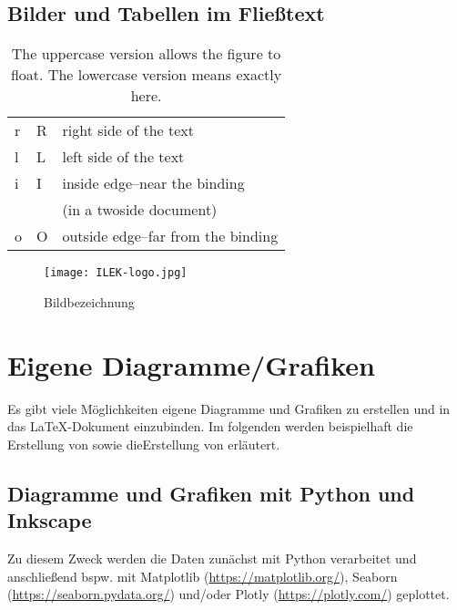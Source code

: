 \newpage

\subsection{Bilder und Tabellen im Fließtext}

\begin{wraptable}[]{o}[0cm]{9cm}
	\begin{center}
		\begin{tabular}{|l|l|l|}
			\hline
			r & R & right side of the text\\
			l & L & left side of the text\\
			i & I & inside edge–near the binding\\
			& &  (in a twoside document)\\
			o & O & outside edge–far from the binding\\
			\hline
		\end{tabular}
	\end{center}
	\caption{The uppercase version allows the figure to float. The lowercase version means exactly here.}%
\end{wraptable}

\blindtext[2]

\begin{wrapfigure}[]{o}[0cm]{6.5cm}
	\texttt{[image: ILEK-logo.jpg]}
	\caption{Bildbezeichnung}
	\label{fig:05_bild}
\end{wrapfigure}

\blindtext[2]

\newpage

\section{Eigene Diagramme/Grafiken}

Es gibt viele Möglichkeiten eigene Diagramme und Grafiken zu erstellen und in das \LaTeX-Dokument einzubinden. Im folgenden werden beispielhaft die Erstellung von  sowie dieErstellung von  erläutert.

\subsection{Diagramme und Grafiken mit Python und Inkscape}
\label{subsec:python_inkscape}

Zu diesem Zweck werden die Daten zunächst mit Python verarbeitet und anschließend bspw. mit Matplotlib (\url{https://matplotlib.org/}), Seaborn (\url{https://seaborn.pydata.org/}) und/oder Plotly (\url{https://plotly.com/}) geplottet.

